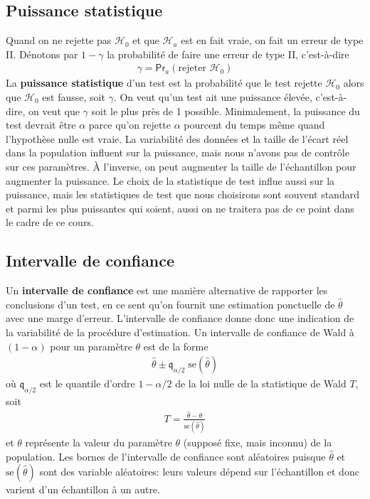 \documentclass[
  11pt,
  letterpaper,
]{book}
\begin{document}
\hypertarget{puissance-statistique}{%
\subsection{Puissance statistique}\label{puissance-statistique}}

Quand on ne rejette pas \(\mathscr{H}_0\) et que \(\mathscr{H}_a\) est en fait vraie, on fait un erreur de type II. Dénotons par \(1-\gamma\) la probabilité de faire une erreur de type II, c'est-à-dire
\begin{align*}
\gamma = \mathsf{Pr}_a(\text{rejeter } \mathscr{H}_0)
\end{align*}
La \textbf{puissance statistique} d'un test est la probabilité que le test rejette \(\mathscr{H}_0\) alors que \(\mathscr{H}_0\) est fausse, soit \(\gamma\). On veut qu'un test ait une puissance élevée, c'est-à-dire, on veut que \(\gamma\) soit le plus près de 1 possible. Minimalement, la puissance du test devrait être \(\alpha\) parce qu'on rejette \(\alpha\) pourcent du temps même quand l'hypothèse nulle est vraie. La variabilité des données et la taille de l'écart réel dans la population influent sur la puissance, mais nous n'avons pas de contrôle sur ces paramètres. À l'inverse, on peut augmenter la taille de l'échantillon pour augmenter la puissance. Le choix de la statistique de test influe aussi sur la puissance, mais les statistiques de test que nous choisirons sont souvent standard et parmi les plus puissantes qui soient, aussi on ne traitera pas de ce point dans le cadre de ce cours.

\hypertarget{intervalle-de-confiance}{%
\subsection{Intervalle de confiance}\label{intervalle-de-confiance}}

Un \textbf{intervalle de confiance} est une manière alternative de rapporter les conclusions d'un test, en ce sent qu'on fournit une estimation ponctuelle de \(\hat{\theta}\) avec une marge d'erreur. L'intervalle de confiance donne donc une indication de la variabilité de la procédure d'estimation. Un intervalle de confiance de Wald à \((1-\alpha)\) pour un paramètre \(\theta\) est de la forme
\begin{align*}
\widehat{\theta} \pm \mathfrak{q}_{\alpha/2} \; \mathrm{se}(\widehat{\theta})
\end{align*}
où \(\mathfrak{q}_{\alpha/2}\) est le quantile d'ordre \(1-\alpha/2\) de la loi nulle de la statistique de Wald \(T\), soit
\begin{align*}
T =\frac{\widehat{\theta}-\theta}{\mathrm{se}(\widehat{\theta})}
\end{align*}
et \(\theta\) représente la valeur du paramètre \(\theta\) (supposé fixe, mais inconnu) de la population. Les bornes de l'intervalle de confiance sont aléatoires puisque \(\widehat{\theta}\) et \(\mathrm{se}(\widehat{\theta})\) sont des variable aléatoires: leurs valeurs dépend sur l'échantillon et donc varient d'un échantillon à un autre.
\end{document}
